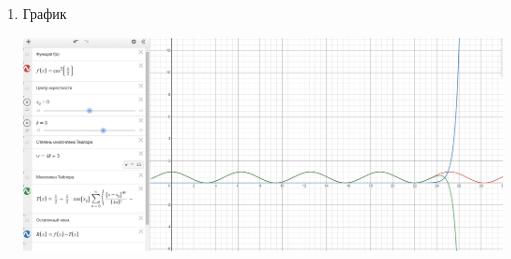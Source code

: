 \begin{enumerate}
    \item График

    \includegraphics[width=1.0\linewidth]{images/graph.png}

\end{enumerate}

\clearpage
